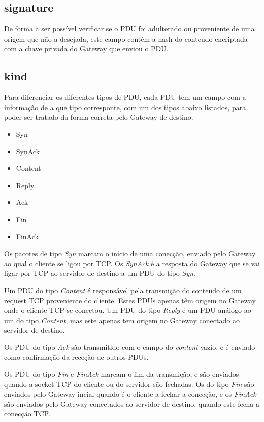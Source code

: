 \documentclass[a4paper]{report}
\begin{document}
\subsection{signature}
De forma a ser possível verificar se o PDU foi adulterado ou proveniente
de uma origem que não a desejada, este campo contém a hash do conteudo
encriptada com a chave privada do Gateway que enviou o PDU.

\subsection{kind}
Para diferenciar os diferentes tipos de PDU, cada PDU tem um campo
com a informação de a que tipo corresponte, com um dos tipos abaixo
listados, para poder ser tratado da forma correta pelo Gateway de 
destino.
\begin{itemize}
        \item Syn
        \item SynAck
        \item Content
        \item Reply
        \item Ack
        \item Fin
        \item FinAck
\end{itemize}

Os pacotes de tipo \textit{Syn} marcam o início de uma conecção, enviado
pelo Gateway ao qual o cliente se ligou por TCP. Os \textit{SynAck}
é a resposta do Gateway que se vai ligar por TCP ao servidor de destino
a um PDU do tipo \textit{Syn}.

Um PDU do tipo \textit{Content} é responsável pela transmição do conteudo
de um request TCP proveniente do cliente. Estes PDUs apenas têm origem
no Gateway onde o cliente TCP se conectou. Um PDU do tipo \textit{Reply}
é um PDU análogo ao um do tipo \textit{Content}, mas este apenas tem origem
no Gateway conectado ao servidor de destino.

Os PDU do tipo \textit{Ack} são transmitido com o campo do \textit{content}
vazio, e é enviado como confirmação da receção de outros PDUs.

Os PDU do tipo \textit{Fin} e \textit{FinAck} marcam o fim da transmição,
e são enviados quando a socket TCP do cliente ou do servidor são fechadas.
Os do tipo \textit{Fin} são enviados pelo Gateway incial quando é o 
cliente a fechar a conecção, e os \textit{FinAck} são enviados pelo Gateway
conectados ao servidor de destino, quando este fecha a conecção TCP.
\end{document}
